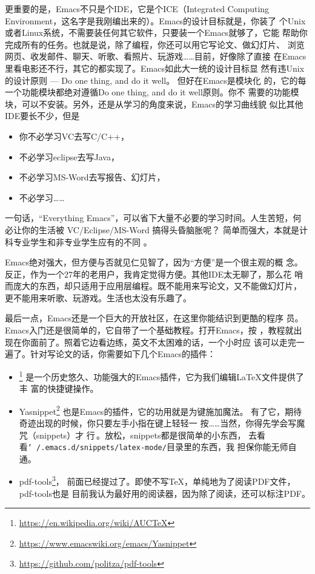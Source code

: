 更重要的是，Emacs不只是个IDE，它是个ICE（Integrated Computing
Environment，这名字是我刚编出来的）。Emacs的设计目标就是，你装了
个Unix或者Linux系统，不需要装任何其它软件，只要装一个Emacs就够了，它能
帮助你完成所有的任务。也就是说，除了编程，你还可以用它写论文、做幻灯片、
浏览网页、收发邮件、聊天、听歌、看照片、玩游戏……目前，好像除了直接
在Emacs里看电影还不行，其它的都实现了。Emacs如此大一统的设计目标显
然有违Unix的设计原则 --- Do one thing, and do it well。 但好在Emacs是模块化
的，它的每一个功能模块都绝对遵循Do one thing, and do it well原则。你不
需要的功能模块，可以不安装。另外，还是从学习的角度来说，Emacs的学习曲线貌
似比其他IDE要长不少，但是
\begin{itemize}
\item 你不必学习VC去写C/C++，
\item 不必学习eclipse去写Java，
\item 不必学习MS-Word去写报告、幻灯片，
\item 不必学习……
\end{itemize}
一句话，“Everything Emacs”，可以省下大量不必要的学习时间。人生苦短，何
必让你的生活被 VC/Eclipse/MS-Word 搞得头昏脑胀呢？ 简单而强大，本就是计
科专业学生和非专业学生应有的不同 。

Emacs绝对强大，但方便与否就见仁见智了，因为“方便”是一个很主观的概
念。反正，作为一个27年的老用户，我肯定觉得方便。其他IDE太无聊了，那么花
哨而庞大的东西，却只适用于应用层编程。既不能用来写论文，又不能做幻灯片，
更不能用来听歌、玩游戏。生活也太没有乐趣了。

最后一点，Emacs还是一个巨大的开放社区，在这里你能结识到更酷的程序
员。Emacs入门还是很简单的，它自带了一个基础教程。打开Emacs，按
，教程就出现在你面前了。照着它边看边练，英文不太困难的话，一个小时应
该可以走完一遍了。针对写论文的话，你需要如下几个Emacs的插件：

\begin{itemize}
\item \auctex\footnote{\url{https://en.wikipedia.org/wiki/AUCTeX}}%
  是一个历史悠久、功能强大的Emacs插件，它为我们编辑\LaTeX{}文件提供了丰
  富的快捷键操作\cite{auctex}。
\item
  Yasnippet\footnote{\url{https://www.emacswiki.org/emacs/Yasnippet}}%
  也是Emacs的插件，它的功用就是为{\LKeyTab}键施加魔法\cite{yasnippet}。
  有了它，期待奇迹出现的时候，你只要左手小指在{\LKeyTab}键上轻轻一
  按……当然，你得先学会写魔咒（snippets）才
  行\,\Frowny{}。\label{p:yasnippet}放松，snippets都是很简单的小东西，
  去看看\texttt{\char`~/.emacs.d/snippets/latex-mode/}目录里的东西，我
  担保你能无师自通。
\item pdf-tools\footnote{\url{https://github.com/politza/pdf-tools}}，
  前面已经提过了。即使不写\TeX{}，单纯地为了阅读PDF文件，pdf-tools也是
  目前我认为最好用的阅读器，因为除了阅读，还可以标注PDF。
\end{itemize}


